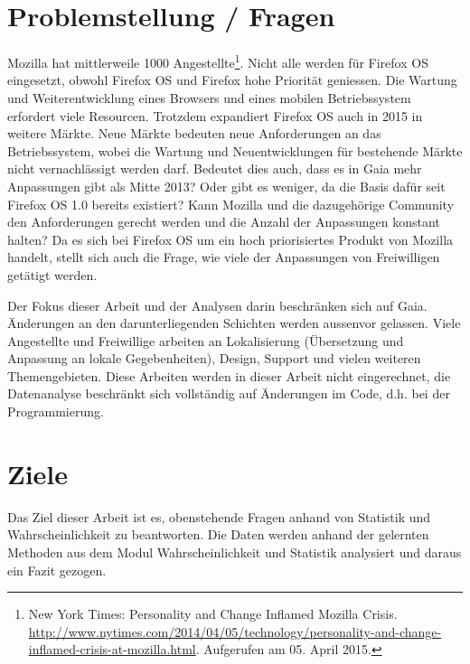 \section{Problemstellung / Fragen}
Mozilla hat mittlerweile 1000 Angestellte\footnote{New York Times: Personality and Change Inflamed Mozilla Crisis. \url{http://www.nytimes.com/2014/04/05/technology/personality-and-change-inflamed-crisis-at-mozilla.html}. Aufgerufen am 05. April 2015.}. Nicht alle werden für Firefox OS eingesetzt, obwohl Firefox OS und Firefox hohe Priorität geniessen. Die Wartung und Weiterentwicklung eines Browsers und eines mobilen Betriebssystem erfordert viele Resourcen. Trotzdem expandiert Firefox OS auch in 2015 in weitere Märkte. Neue Märkte bedeuten neue Anforderungen an das Betriebssystem, wobei die Wartung und Neuentwicklungen für bestehende Märkte nicht vernachlässigt werden darf. Bedeutet dies auch, dass es in Gaia mehr Anpassungen gibt als Mitte 2013? Oder gibt es weniger, da die Basis dafür seit Firefox OS 1.0 bereits existiert? Kann Mozilla und die dazugehörige Community den Anforderungen gerecht werden und die Anzahl der Anpassungen konstant halten? Da es sich bei Firefox OS um ein hoch priorisiertes Produkt von Mozilla handelt, stellt sich auch die Frage, wie viele der Anpassungen von Freiwilligen getätigt werden.

Der Fokus dieser Arbeit und der Analysen darin beschränken sich auf Gaia. Änderungen an den darunterliegenden Schichten werden aussenvor gelassen. Viele Angestellte und Freiwillige arbeiten an Lokalisierung (Übersetzung und Anpassung an lokale Gegebenheiten), Design, Support und vielen weiteren Themengebieten. Diese Arbeiten werden in dieser Arbeit nicht eingerechnet, die Datenanalyse beschränkt sich vollständig auf Änderungen im Code, d.h. bei der Programmierung.

\section{Ziele}
Das Ziel dieser Arbeit ist es, obenstehende Fragen anhand von Statistik und Wahrscheinlichkeit zu beantworten. Die Daten werden anhand der gelernten Methoden aus dem Modul Wahrscheinlichkeit und Statistik analysiert und daraus ein Fazit gezogen.